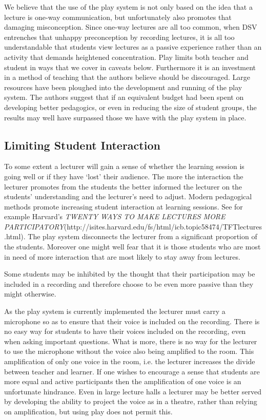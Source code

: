 \documentclass[a4paper,10pt]{article}
\begin{document}
We believe that the use of the play system is not only based on the idea that a lecture is one-way communication, but unfortunately also promotes that damaging misconception. Since one-way lectures are all too common, when DSV entrenches that unhappy preconception by recording lectures, it is all too understandable that students view lectures as a passive experience rather than an activity that demands heightened concentration. Play limits both teacher and student in ways that we cover in caveats below. Furthermore it is an investment in a method of teaching that the authors believe should be discouraged. Large resources have been ploughed into the development and running of the play system. The authors suggest that if an equivalent budget had been spent on developing better pedagogics, or even in reducing the size of student groups, the results may well have surpassed those we have with the play system in place.


\subsection{Limiting Student Interaction}
To some extent a lecturer will gain a sense of whether the learning session is going well or if they have `lost' their audience. The more the interaction the lecturer promotes from the students the better informed the lecturer on the students' understanding and the lecturer's need to adjust. Modern pedagogical methods promote increasing student interaction at learning sessions. See for example Harvard's \emph{TWENTY WAYS TO MAKE LECTURES MORE PARTICIPATORY}(http://isites.harvard.edu/fs/html/icb.topic58474/TFTlectures.html). The play system disconnects the lecturer from a significant proportion of the students. Moreover one might well fear that it is those students who are most in need of more interaction that are most likely to stay away from lectures.

Some students may be inhibited by the thought that their participation may be included in a recording and therefore choose to be even more passive than they might otherwise. 

As the play system is currently implemented the lecturer must carry a microphone so as to ensure that their voice is included on the recording. There is no easy way for students to have their voices included on the recording, even when asking important questions. What is more, there is no way for the lecturer to use the microphone without the voice also being amplified to the room. This amplification of only one voice in the room, i.e. the lecturer increases the divide between teacher and learner. If one wishes to encourage a sense that students are more equal and active participants then the amplification of one voice is an unfortunate hindrance. Even in large lecture halls a lecturer may be better served by developing the ability to project the voice as in a theatre, rather than relying on amplification, but using play does not permit this.
\end{document}
